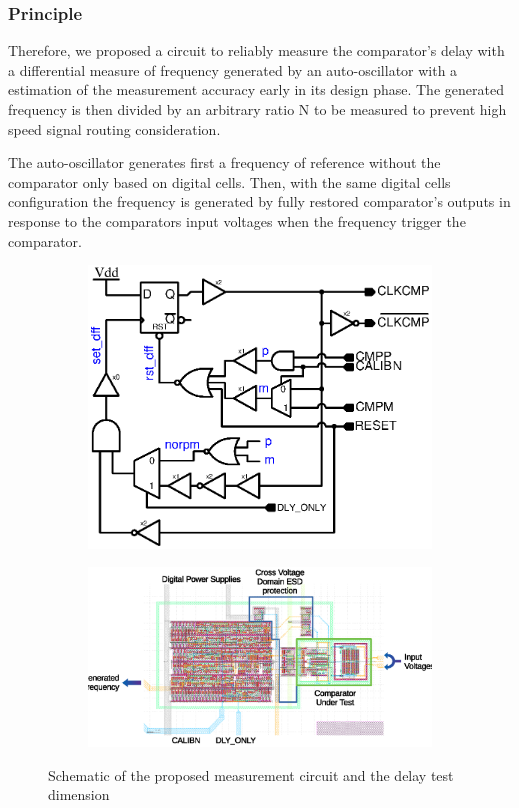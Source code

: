 \subsubsection{Principle}
Therefore, we proposed a circuit to reliably measure the comparator's delay with a differential measure of frequency generated by an auto-oscillator with a estimation of the measurement accuracy early in its design phase. The generated frequency is then divided by an arbitrary ratio N to be measured to prevent high speed signal routing consideration.

The auto-oscillator generates first a frequency of reference without the comparator only based on digital cells. Then, with the same digital cells configuration the frequency is generated by fully restored comparator's outputs in response to the comparators input voltages when the frequency trigger the comparator.

\begin{figure}[htp]
    \centering
    \begin{subfigure}[b]{0.47\linewidth}
	    \includegraphics[width=\textwidth]{Chapter5/Figs/test_delay_comp_new_simp.ps}
    \end{subfigure}
    \begin{subfigure}[b]{0.50\linewidth}
	    \includegraphics[width=\textwidth]{Chapter5/Figs/layout_delay_meas.eps}
    \end{subfigure}
    \caption{Schematic of the proposed measurement circuit and the delay test dimension}
	\label{fig:meas_circ_schem}
\end{figure}

